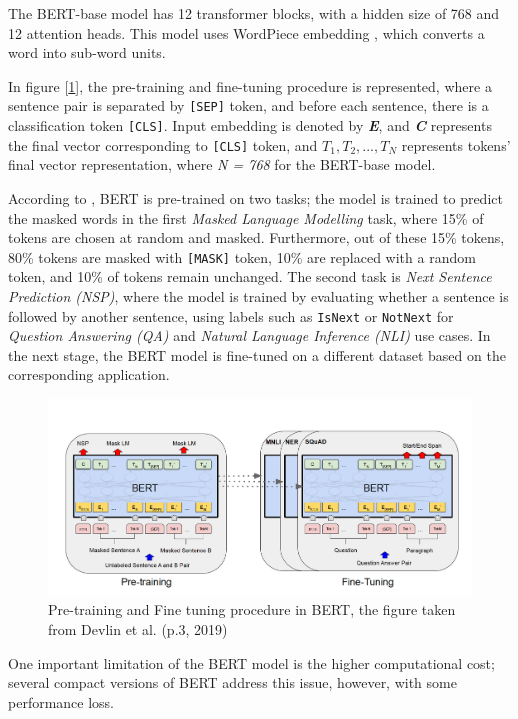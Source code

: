 \documentclass[11pt]{article}
\begin{document}
The BERT-base model has 12 transformer blocks, with a hidden size of 768 and 12 attention heads. This model uses WordPiece embedding \cite{wordpiece}, which converts a word into sub-word units.

In figure [\ref{fig:BERT_archi}], the pre-training and fine-tuning procedure is represented, where a sentence pair is separated by \texttt{[SEP]} token, and before each sentence, there is a classification token \texttt{[CLS]}. Input embedding is denoted by \textbf{\textit{E}}, and \textbf{\textit{C}} represents the final vector corresponding to \texttt{[CLS]} token, and $T_1, T_2, ..., T_N$ represents tokens' final vector representation, where \textit{N = 768} for the BERT-base model.  

According to \cite{BERT}, BERT is pre-trained on two tasks; the model is trained to predict the masked words in the first \textit{Masked Language Modelling} task, where 15\% of tokens are chosen at random and masked. Furthermore, out of these 15\% tokens, 80\% tokens are masked with \texttt{[MASK]} token, 10\% are replaced with a random token, and 10\%  of tokens remain unchanged. The second task is \textit{Next Sentence Prediction (NSP)}, where the model is trained by evaluating whether a sentence is followed by another sentence, using labels such as \texttt{IsNext} or \texttt{NotNext} for\textit{ Question Answering (QA)} and \textit{Natural Language Inference (NLI)} use cases. In the next stage, the BERT model is fine-tuned on a different dataset based on the corresponding application.

\begin{figure}
\label{fig:BERT_embedding}
    \centering
    \includegraphics[scale=0.6]{figures/BERT-embedding.png}
    \caption{Pre-training and Fine tuning procedure in BERT, the figure taken from Devlin et al. (p.3, 2019)}
    \label{fig:BERT_archi}
\end{figure}
One important limitation of the BERT model is the higher computational cost; several compact versions of BERT address this issue, however, with some performance loss.
\end{document}
